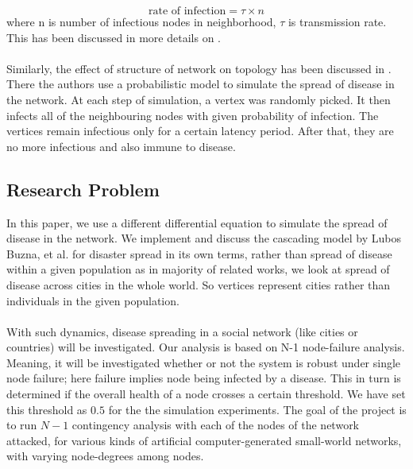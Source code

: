 \documentclass[11pt]{article}
\begin{document}
\[ \text {rate of infection} = \tau \times n \] where n is number of infectious nodes in neighborhood, $\tau$ is transmission rate. This has been discussed in more details on \cite{keeling}.\\
\\
Similarly, the effect of structure of network on topology has been discussed in \cite{shirley}. There the authors use a probabilistic model to simulate the spread of disease in the network. At each step of simulation, a vertex was randomly picked. It then infects all of the neighbouring nodes with given probability of infection. The vertices remain infectious only for a certain latency period. After that, they are no more infectious and also immune to disease.

\subsection{Research Problem}
In this paper, we use a different differential equation to simulate the spread of disease in the network. We implement and discuss the cascading model by Lubos Buzna, et al. \cite{helbing} for disaster spread in its own terms, rather than spread of disease within a given population as in majority of related works, we look at spread of disease across cities in the whole world. So vertices represent cities rather than individuals in the given population.\\
\\
With such dynamics, disease spreading in a social network (like cities or countries) will be investigated.  Our analysis is based on N-1 node-failure analysis. Meaning, it will be investigated whether or not the system is robust under single node failure; here failure implies node being infected by a disease. This in turn is determined if the overall health of a node crosses a certain threshold. We have set this threshold as $0.5$ for the the simulation experiments. The goal of the project is to run $N-1$ contingency analysis with each of the nodes of the network attacked, for various kinds of artificial computer-generated small-world networks, with varying node-degrees among nodes.\\
\\
\end{document}
